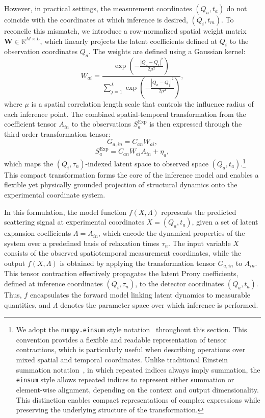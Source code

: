 \documentclass[12pt]{article}
\begin{document}
However, in practical settings, the measurement coordinates \( (Q_a, t_a) \) do not coincide with the coordinates at which inference is desired, \( (Q_i, t_m) \). To reconcile this mismatch, we introduce a row-normalized spatial weight matrix \( \mathbf{W} \in \mathbb{R}^{M \times L} \), which linearly projects the latent coefficients defined at \( Q_i \) to the observation coordinates \( Q_a \). The weights are defined using a Gaussian kernel:
\begin{equation}
    W_{ai} = \frac{\exp\left(-\frac{|Q_a - Q_i|^2}{2\mu^2}\right)}{\sum_{j=1}^{L} \exp\left(-\frac{|Q_a - Q_j|^2}{2\mu^2}\right)},
\end{equation}
where \( \mu \) is a spatial correlation length scale that controls the influence radius of each inference point. The combined spatial-temporal transformation from the coefficient tensor \( A_{in} \) to the observations \( S_a^{\mathrm{Exp}} \) is then expressed through the third-order transformation tensor:
\begin{equation}
    G_{a,in} = C_{an} W_{ai},
    \label{eq:G_definition}
\end{equation}
\begin{equation}
    S_a^{\mathrm{Exp}} = C_{an} W_{ai} A_{in} + \eta_a,
    \label{eq:CWA_eta}
\end{equation}
which maps the \( (Q_i, \tau_n) \)-indexed latent space to observed space \( (Q_a, t_a) \).\footnote{We adopt the \texttt{numpy.einsum} style notation~\cite{harris2020array} throughout this section. This convention provides a flexible and readable representation of tensor contractions, which is particularly useful when describing operations over mixed spatial and temporal coordinates. Unlike traditional Einstein summation notation~\cite{Simmonds1994}, in which repeated indices always imply summation, the \texttt{einsum} style allows repeated indices to represent either summation or element-wise alignment, depending on the context and output dimensionality. This distinction enables compact representations of complex expressions while preserving the underlying structure of the transformation. 
} This compact transformation forms the core of the inference model and enables a flexible yet physically grounded projection of structural dynamics onto the experimental coordinate system.

In this formulation, the model function \( f(X, \Lambda) \) represents the predicted scattering signal at experimental coordinates \( X=(Q_a, t_a) \), given a set of latent expansion coefficients \( \Lambda = A_{in} \), which encode the dynamical properties of the system over a predefined basis of relaxation times \( \tau_n \). The input variable \( X \) consists of the observed spatiotemporal measurement coordinates, while the output \( f(X, \Lambda) \) is obtained by applying the transformation tensor \( G_{a,in} \) to \( A_{in} \). This tensor contraction effectively propagates the latent Prony coefficients, defined at inference coordinates \( (Q_i, \tau_n) \), to the detector coordinates \( (Q_a, t_a) \). Thus, \( f \) encapsulates the forward model linking latent dynamics to measurable quantities, and \( \Lambda \) denotes the parameter space over which inference is performed.
\end{document}
